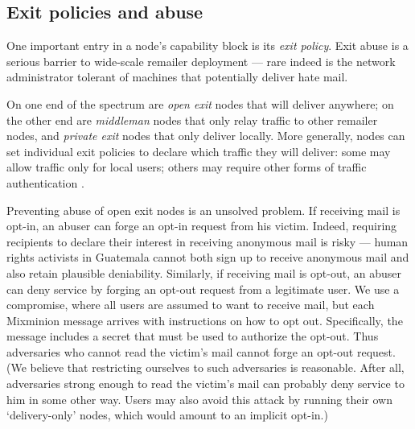 \documentclass[final,inpress,inline]{ieee}
\begin{document}
\subsection{Exit policies and abuse}
\label{subsec:exitpolicies}

One important entry in a node's capability block is its \emph{exit
policy}. Exit abuse is a serious barrier to wide-scale remailer deployment
--- rare indeed is the network administrator tolerant of machines that
potentially deliver hate mail. %

On one end of the spectrum are \emph{open exit} nodes that will
deliver anywhere; on the other end are \emph{middleman} nodes that
only relay traffic to other remailer nodes, and \emph{private exit}
nodes that only deliver locally. More generally, nodes can set
individual exit policies to declare which traffic they will deliver:
some may allow traffic only for local users; others may require
other forms of traffic authentication
\cite{onion-discex00}.

Preventing abuse of open exit nodes is an unsolved problem. If
receiving mail is opt-in, an abuser can forge an opt-in request from
his victim. Indeed, requiring recipients to declare their interest
in receiving anonymous mail is risky --- human rights activists in
Guatemala cannot both sign up to receive anonymous mail and also retain
plausible deniability. %
Similarly, if receiving mail is opt-out, an abuser can deny service
by forging an opt-out request from a legitimate user. We use a compromise,
where all users are assumed to want to receive mail, but each Mixminion
message arrives with instructions on how to opt out. Specifically, the
message includes a secret that must be used to authorize the opt-out. Thus
adversaries who cannot read the victim's mail cannot forge an opt-out
request.  (We believe that restricting ourselves to such adversaries is
reasonable.  After all, adversaries strong enough to read the victim's mail
can probably deny service to him in some other way.  Users may also avoid
this attack by running their own `delivery-only' nodes, which would amount to
an implicit opt-in.)
\end{document}
